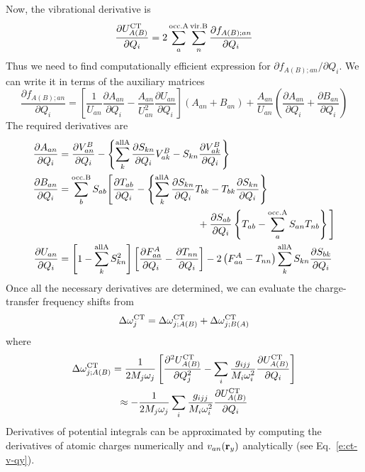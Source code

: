 \documentclass[b5paper,oneside,fleqn,11pt]{book}
\newcommand{\fderiv}[2]{\ensuremath{
    \frac{\partial #1}{\partial #2}}}
\newcommand{\sderiv}[2]{\ensuremath{
    \frac{\partial^2 #1}{\partial #2^2}
    }}
\newcommand{\fderivm}[2]{\ensuremath{
    {\partial #1}/{\partial #2}}}
\begin{document}
\begin{refsection}
Now, the vibrational derivative is
%
\begin{equation}   \label{e:force-ct-ab}
  \fderiv{U^{\rm CT}_{A(B)}}{Q_i} = 2\sum_a^{\rm occ. A} \sum_n^{\rm vir. B} \fderiv{f_{A(B);an}}{Q_i}
\end{equation}
%
Thus we need to find computationally efficient expression for $\fderivm{f_{A(B);an}}{Q_i}$.
We can write it in terms of the auxiliary matrices
%
\begin{equation}  
  \fderiv{f_{A(B);an}}{Q_i} = 
  \left[
 \frac{1}{U_{an}} \fderiv{A_{an}}{Q_i} - \frac{A_{an}}{U_{an}^2} \fderiv{U_{an}}{Q_i}
  \right] \left( A_{an} + B_{an} \right) 
   +
  \frac{A_{an}}{U_{an}} \left( \fderiv{A_{an}}{Q_i} + \fderiv{B_{an}}{Q_i} \right)
\end{equation}
%
The required derivatives are
%
\begin{subequations}  
\begin{align}
    \fderiv{A_{an}}{Q_i}  &= \fderiv{V^B_{an}}{Q_i} 
       - \left\{
          \sum_k^{\rm all A} \fderiv{S_{kn}}{Q_i}  V_{ak}^B - S_{kn} \fderiv{V_{ak}^B}{Q_i}
         \right\}  \\
    \fderiv{B_{an}}{Q_i}  &= \sum_b^{\rm occ. B} S_{ab} \Bigg[ 
         \fderiv{T_{ab}}{Q_i} - \left\{
          \sum_k^{\rm all A} \fderiv{S_{kn}}{Q_i}  T_{bk} - T_{bk} \fderiv{S_{kn}}{Q_i}
         \right\} \nonumber \\
      &\qquad\qquad\qquad\qquad\qquad\qquad\qquad+ \fderiv{S_{ab}}{Q_i}  \left\{ T_{ab} - \sum_a^{\rm occ. A} S_{an}T_{nb} \right\}
       \Bigg] \\
    \fderiv{U_{an}}{Q_i}  &= \left[ 1 - \sum_k^{\rm all A} S^2_{kn}\right]
                             \left[ \fderiv{F_{aa}^A}{Q_i} - \fderiv{T_{nn}}{Q_i}\right] 
                     -2  \left( F_{aa}^A - T_{nn} \right) \sum_k^{\rm all A} S_{kn} \fderiv{S_{bk}}{Q_i}
\end{align}
\end{subequations}
%
Once all the necessary derivatives are determined, 
we can evaluate the charge\hyp{}transfer frequency shifts
from
%
\begin{equation} \label{e:dw-ct}
\Delta \omega_j^{\rm CT} =
\Delta \omega_{j;A(B)}^{\rm CT} + \Delta \omega_{j;B(A)}^{\rm CT}
\end{equation}
%
where
%
\begin{multline} \label{e:dw-ct-ab}
\Delta \omega_{j;A(B)}^{\rm CT} =
\frac{1}{2M_j\omega_j} \left[ 
\sderiv{U^{\rm CT}_{A(B)}}{Q_j} -
\sum_i \frac{g_{ijj}}{M_i\omega_i^2}\fderiv{U^{\rm CT}_{A(B)}}{Q_i}
\right]
\\\approx 
-\frac{1}{2M_j\omega_j}\sum_i \frac{g_{ijj}}{M_i\omega_i^2}\fderiv{U^{\rm CT}_{A(B)}}{Q_i}
\end{multline}
%
Derivatives of potential integrals can be approximated by
computing the derivatives of atomic charges numerically
and $v_{an}({\bf r}_y)$ analytically (see Eq.~\eqref{e:ct-v-qy}).


\end{refsection}
\end{document}
